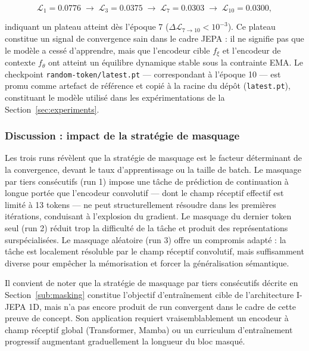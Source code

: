 \begin{equation}
\mathcal{L}_1 = 0.0776 \;\to\; \mathcal{L}_3 = 0.0375 \;\to\; \mathcal{L}_7 = 0.0303
\;\to\; \mathcal{L}_{10} = 0.0300,
\end{equation}

indiquant un plateau atteint dès l'époque 7 ($\Delta\mathcal{L}_{7 \to 10} < 10^{-3}$).
Ce plateau constitue un signal de convergence sain dans le cadre JEPA : il ne signifie
pas que le modèle a cessé d'apprendre, mais que l'encodeur cible $f_\xi$ et l'encodeur
de contexte $f_\theta$ ont atteint un équilibre dynamique stable sous la contrainte EMA.
Le checkpoint \texttt{random-token/latest.pt} — correspondant à l'époque 10 — est promu
comme artefact de référence et copié à la racine du dépôt (\texttt{latest.pt}), constituant
le modèle utilisé dans les expérimentations de la Section~\ref{sec:experiments}.

\subsubsection{Discussion : impact de la stratégie de masquage}

Les trois runs révèlent que la stratégie de masquage est le facteur déterminant de la
convergence, devant le taux d'apprentissage ou la taille de batch. Le masquage par tiers
consécutifs (run 1) impose une tâche de prédiction de continuation à longue portée que
l'encodeur convolutif — dont le champ réceptif effectif est limité à 13 tokens — ne
peut structurellement résoudre dans les premières itérations, conduisant à l'explosion du
gradient. Le masquage du dernier token seul (run 2) réduit trop la difficulté de la
tâche et produit des représentations surspécialisées. Le masquage aléatoire (run 3)
offre un compromis adapté : la tâche est localement résoluble par le champ réceptif
convolutif, mais suffisamment diverse pour empêcher la mémorisation et forcer la
généralisation sémantique.

Il convient de noter que la stratégie de masquage par tiers consécutifs décrite en
Section~\ref{sub:masking} constitue l'objectif d'entraînement cible de l'architecture
I-JEPA 1D, mais n'a pas encore produit de run convergent dans le cadre de cette preuve
de concept. Son application requiert vraisemblablement un encodeur à champ réceptif
global (Transformer, Mamba) ou un curriculum d'entraînement progressif augmentant
graduellement la longueur du bloc masqué.

